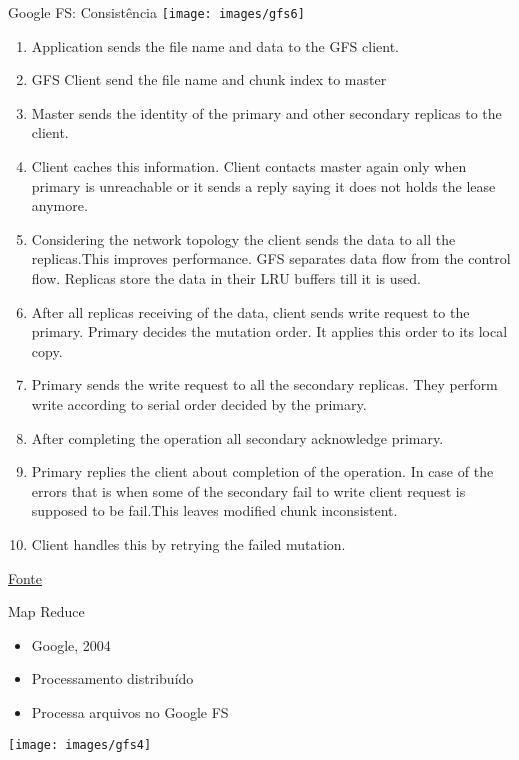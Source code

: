 \begin{frame}{Google FS: Consistência }
\texttt{[image: images/gfs6]}

\framebreak
\begin{enumerate}
\item Application sends the file name and data to the GFS client.
\item GFS Client send the file name and chunk index to master
\item Master sends the identity of the primary and other secondary replicas to the client.
\item Client caches this information. Client contacts master again only when primary is unreachable or it sends a reply saying it does not holds the lease anymore.
\item Considering the network topology the client sends the data to all the replicas.This improves performance. GFS separates data flow from the control flow. Replicas store the data in their LRU buffers till it is used.
\item After all replicas receiving of the data, client sends write request to the primary. Primary decides the mutation order. It applies this order to its local copy.
\item Primary sends the write request to all the secondary replicas. They perform write according to serial order decided by the primary.
\item After completing the operation all secondary acknowledge primary.
\item Primary replies the client about completion of the operation. In case of the errors that is when some of the secondary fail to write client request is supposed to be fail.This leaves modified chunk inconsistent. \item Client handles this by retrying the failed mutation. 
\end{enumerate}

\href{http://google-file-system.wikispaces.asu.edu/}{Fonte}
\end{frame}

\begin{frame}{Map Reduce}
\begin{itemize}
	\item Google, 2004
	\item Processamento distribuído
	\item Processa arquivos no Google FS
\end{itemize}
\texttt{[image: images/gfs4]}
\end{frame}

